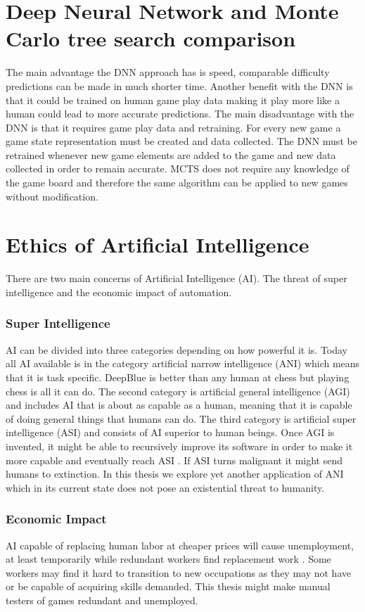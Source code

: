\documentclass{kththesis}
\begin{document}
\section{Deep Neural Network and Monte Carlo tree search comparison}
The main advantage the DNN approach has is speed, comparable difficulty predictions can be made in much shorter time. Another benefit with the DNN is that it could be trained on human game play data making it play more like a human could lead to more accurate predictions. The main disadvantage with the DNN is that it requires game play data and retraining. For every new game a game state representation must be created and data collected. The DNN must be retrained whenever new game elements are added to the game and new data collected in order to remain accurate. MCTS does not require any knowledge of the game board and therefore the same algorithm can be applied to new games without modification.

\section{Ethics of Artificial Intelligence}
There are two main concerns of Artificial Intelligence (AI). The threat of super intelligence and the economic impact of automation.

\subsubsection{Super Intelligence}
AI can be  divided into three categories  depending on how powerful it is. Today all AI available is in the category artificial narrow intelligence (ANI) which means that it is task specific. DeepBlue is better than any human at chess but playing chess is all it can do. The second category is artificial general intelligence (AGI) and  includes AI that is about as capable as a human, meaning that it is capable of doing general things that humans can do. The third category is  artificial super intelligence (ASI) and  consists of AI superior to human beings. Once AGI is invented, it might be able to recursively improve its software in order to make it more capable and eventually reach ASI \cite{bostrom1998long}. If ASI turns malignant it might send humans to extinction. In this thesis we explore yet another application of ANI which in its current state does not pose an existential threat to humanity.

\subsubsection{Economic Impact}
AI capable of replacing human labor  at cheaper prices will cause unemployment, at least temporarily while redundant workers  find replacement work \cite{nilsson1984artificial}. Some workers may find it hard to transition to new occupations as they may not have or be capable of acquiring skills demanded. This thesis might make  manual testers of games redundant and unemployed.
\end{document}
